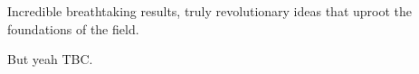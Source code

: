 Incredible breathtaking results, truly revolutionary ideas that uproot the foundations of the field.

But yeah TBC.